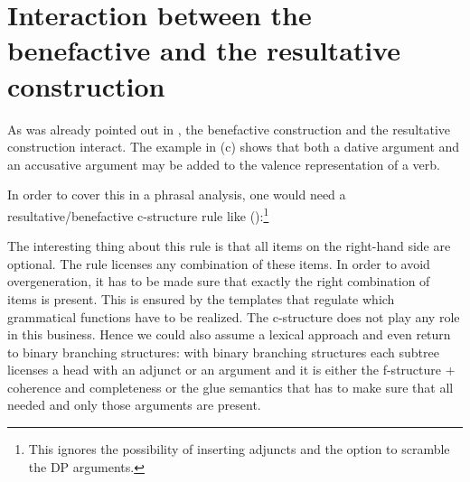 \section{Interaction between the benefactive and the resultative construction}

As was already pointed out in , the benefactive construction and the
resultative construction interact. The example in (c) shows that both a dative argument and an
accusative argument may be added to the valence representation of a verb.
\eal
{}
\zl

In order to cover this in a phrasal analysis, one would need a resultative/benefactive c-structure rule like
():\footnote{%
  This ignores the possibility of inserting adjuncts and the option to scramble the DP arguments.
}
\ea\label{c-struc-vp-benefactive-resultative-optional-args}
\z

The interesting thing about this rule is that all items on the right-hand side are optional. The
rule licenses any combination of these items. In order to avoid overgeneration, it has to be made
sure that exactly the right combination of items is present. This is ensured by the templates that
regulate which grammatical functions have to be realized. The c-structure does not play any role in
this business. Hence we could also assume a lexical approach and even return to binary branching
structures: with binary branching structures each subtree licenses a head with an adjunct
or an argument and it is either the f-structure + coherence and completeness or the glue semantics
that has to make sure that all needed and only those arguments are present.

